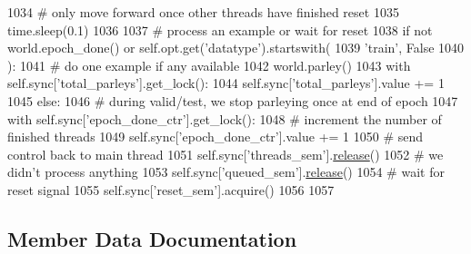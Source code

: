 \begin{DoxyCode}
1034                     \textcolor{comment}{# only move forward once other threads have finished reset}
1035                     time.sleep(0.1)
1036 
1037                 \textcolor{comment}{# process an example or wait for reset}
1038                 \textcolor{keywordflow}{if} \textcolor{keywordflow}{not} world.epoch\_done() \textcolor{keywordflow}{or} self.opt.get(\textcolor{stringliteral}{'datatype'}).startswith(
1039                     \textcolor{stringliteral}{'train'}, \textcolor{keyword}{False}
1040                 ):
1041                     \textcolor{comment}{# do one example if any available}
1042                     world.parley()
1043                     with self.sync[\textcolor{stringliteral}{'total\_parleys'}].get\_lock():
1044                         self.sync[\textcolor{stringliteral}{'total\_parleys'}].value += 1
1045                 \textcolor{keywordflow}{else}:
1046                     \textcolor{comment}{# during valid/test, we stop parleying once at end of epoch}
1047                     with self.sync[\textcolor{stringliteral}{'epoch\_done\_ctr'}].get\_lock():
1048                         \textcolor{comment}{# increment the number of finished threads}
1049                         self.sync[\textcolor{stringliteral}{'epoch\_done\_ctr'}].value += 1
1050                     \textcolor{comment}{# send control back to main thread}
1051                     self.sync[\textcolor{stringliteral}{'threads\_sem'}].\hyperlink{namespaceconf_a325dc746d8bf05c54d26351c35a21d90}{release}()
1052                     \textcolor{comment}{# we didn't process anything}
1053                     self.sync[\textcolor{stringliteral}{'queued\_sem'}].\hyperlink{namespaceconf_a325dc746d8bf05c54d26351c35a21d90}{release}()
1054                     \textcolor{comment}{# wait for reset signal}
1055                     self.sync[\textcolor{stringliteral}{'reset\_sem'}].acquire()
1056 
1057 
\end{DoxyCode}


\subsection{Member Data Documentation}
\mbox{\label{classparlai_1_1core_1_1worlds_1_1HogwildProcess_a4266e7c47686cd9b4fa9d62ae84375c8}} 
